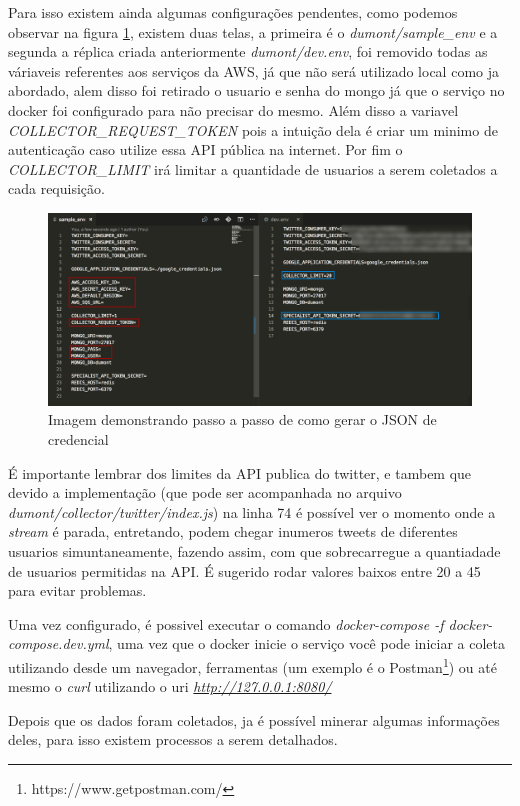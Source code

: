 Para isso existem ainda algumas configurações pendentes, como podemos observar na figura \ref{fig:creds}, existem duas telas, a primeira é o \textit{dumont/sample\_env} e a segunda a réplica criada anteriormente \textit{dumont/dev.env}, foi removido todas as váriaveis referentes aos serviços da AWS, já que não será utilizado local como ja abordado, alem disso foi retirado o usuario e senha do mongo já que o serviço no docker foi configurado para não precisar do mesmo. Além disso a variavel \textit{COLLECTOR\_REQUEST\_TOKEN} pois a intuição dela é criar um minimo de autenticação caso utilize essa API pública na internet. Por fim o \textit{COLLECTOR\_LIMIT} irá limitar a quantidade de usuarios a serem coletados a cada requisição.

\begin{figure}
    \centering
    \includegraphics[width=1\textwidth]{imagens/creds.png}
    \caption{Imagem demonstrando passo a passo de como gerar o JSON de credencial}
    \label{fig:creds}
\end{figure}

É importante lembrar dos limites da API publica do twitter, e tambem que devido a implementação (que pode ser acompanhada no arquivo \textit{dumont/collector/twitter/index.js}) na linha 74 é possível ver o momento onde a \textit{stream} é parada, entretando, podem chegar inumeros tweets de diferentes usuarios simuntaneamente, fazendo assim, com que sobrecarregue a quantiadade de usuarios permitidas na API. É sugerido rodar valores baixos entre 20 a 45 para evitar problemas.

Uma vez configurado, é possivel executar o comando \textit{docker-compose -f docker-compose.dev.yml}, uma vez que o docker inicie o serviço você pode iniciar a coleta utilizando desde um navegador, ferramentas (um exemplo é o Postman\footnote{https://www.getpostman.com/}) ou até mesmo o \textit{curl} utilizando o uri \textit{\url{http://127.0.0.1:8080/}}

Depois que os dados foram coletados, ja é possível minerar algumas informações deles, para isso existem processos a serem detalhados.